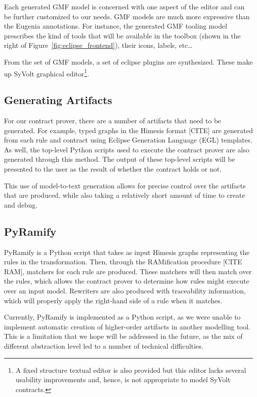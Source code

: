 Each generated GMF model is concerned with one aspect of the editor and can be further customized to our needs. GMF models are much more expressive than the Eugenia annotations.
For instance, the generated GMF tooling model prescribes the kind of tools that
will be available in the toolbox (shown in the right of
Figure~\ref{fig:eclipse_frontend}), their icons, labels, etc\ldots

From the set of GMF models, a set of eclipse plugins are synthesized.
These make up SyVolt graphical editor\footnote{A fixed structure textual editor is also provided but this editor lacks several usability improvements and, hence, is not appropriate to model SyVolt contracts.}.


\subsection{Generating Artifacts}
For our contract prover, there are a number of artifacts that need to be generated. For example, typed graphs in the Himesis format [CITE] are generated from each rule and contract using Eclipse Generation Language (EGL) templates. As well, the top-level Python scripts used to execute the contract prover are also generated through this method. The output of these top-level scripts will be presented to the user as the result of whether the contract holds or not.

This use of model-to-text generation allows for precise control over the artifacts that are produced, while also taking a relatively short amount of time to create and debug.

\subsection{PyRamify}

PyRamify is a Python script that takes as input Himesis graphs representing the rules in the transformation. Then, through the RAMification procedure [CITE RAM], matchers for each rule are produced. These matchers will then match over the rules, which allows the contract prover to determine how rules might execute over an input model. Rewriters are also produced with traceability information, which will properly apply the right-hand side of a rule when it matches.

Currently, PyRamify is implemented as a Python script, as we were unable to implement automatic creation of higher-order artifacts in another modelling tool. This is a limitation that we hope will be addressed in the future, as the mix of different abstraction level led to a number of technical difficulties.

